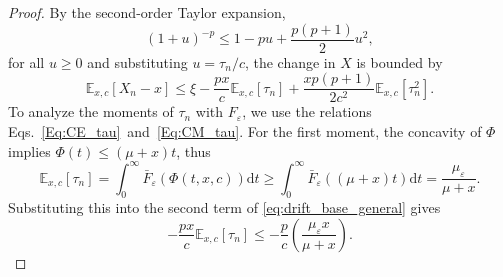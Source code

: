 \documentclass[11pt]{article}
\newcommand{\D}{\mathrm{d}}
\theoremstyle{definition}
\begin{document}
\begin{proof}
	By the second-order Taylor expansion, 
	$$(1+u)^{-p} \le 1 - pu + \frac{p(p+1)}{2}u^2,$$
	for all $u\ge0$ and substituting $u = \tau_n/c$, the change in $X$ is bounded by 
	\begin{equation}\label{eq:drift_base_general}
		\mathbb{E}_{x,c}[X_n - x] \le \xi - \frac{px}{c} \mathbb{E}_{x,c}[\tau_n] + \frac{xp(p+1)}{2c^2} \mathbb{E}_{x,c}[\tau_n^2].
	\end{equation}
	To analyze the moments of $\tau_n$ with $F_\varepsilon$, we use the relations Eqs.~\eqref{Eq:CE_tau}~and~\eqref{Eq:CM_tau}. 
	For the first moment, the concavity of $\Phi$ implies $\Phi(t) \le (\mu + x)t$, thus
	\begin{equation}
		\mathbb{E}_{x,c}[\tau_n] = \int_0^\infty \bar{F}_\varepsilon(\Phi(t,x,c)) \D t \ge \int_0^\infty \bar{F}_\varepsilon((\mu + x)t) \D t = \frac{\mu_{\varepsilon}}{\mu + x}.
	\end{equation}
	Substituting this into the second term of \eqref{eq:drift_base_general} gives $$-\frac{px}{c} \mathbb{E}_{x,c}[\tau_n] \le -\frac{p}{c} \left(\frac{\mu_{\varepsilon} x}{\mu + x}\right).$$ 
	

\end{proof}
\end{document}
